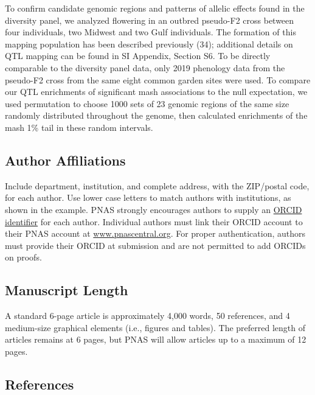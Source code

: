 \documentclass[
  9pt,
  twocolumn,
  twoside]{pnas-new}
\begin{document}
To confirm candidate genomic regions and patterns of allelic effects
found in the diversity panel, we analyzed flowering in an outbred
pseudo-F2 cross between four individuals, two Midwest and two Gulf
individuals. The formation of this mapping population has been described
previously (34); additional details on QTL mapping can be found in SI
Appendix, Section S6. To be directly comparable to the diversity panel
data, only 2019 phenology data from the pseudo-F2 cross from the same
eight common garden sites were used. To compare our QTL enrichments of
significant mash associations to the null expectation, we used
permutation to choose 1000 sets of 23 genomic regions of the same size
randomly distributed throughout the genome, then calculated enrichments
of the mash 1\% tail in these random intervals.

\subsection*{Author Affiliations}\label{author-affiliations}

Include department, institution, and complete address, with the
ZIP/postal code, for each author. Use lower case letters to match
authors with institutions, as shown in the example. PNAS strongly
encourages authors to supply an \href{https://orcid.org/}{ORCID
identifier} for each author. Individual authors must link their ORCID
account to their PNAS account at
\href{http://www.pnascentral.org/}{www.pnascentral.org}. For proper
authentication, authors must provide their ORCID at submission and are
not permitted to add ORCIDs on proofs.

\subsection*{Manuscript Length}\label{manuscript-length}

A standard 6-page article is approximately 4,000 words, 50 references,
and 4 medium-size graphical elements (i.e., figures and tables). The
preferred length of articles remains at 6 pages, but PNAS will allow
articles up to a maximum of 12 pages.

\subsection*{References}\label{references}
\end{document}
